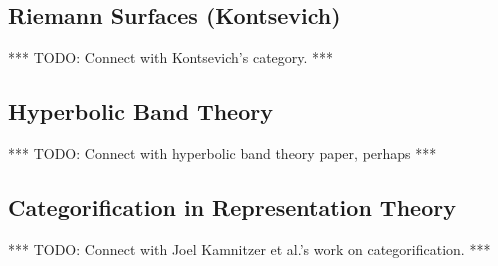 \documentclass{amsart}
\newcommand{\TODO}[1]{{\color{blue!55!black} *** TODO: #1 ***}}
\numberwithin{thm}{section}
\theoremstyle{definition}
\begin{document}
\subsection{Riemann Surfaces (Kontsevich)}

\TODO{Connect with Kontsevich's category.}

\subsection{Hyperbolic Band Theory}

\TODO{Connect with hyperbolic band theory paper, perhaps}

\subsection{Categorification in Representation Theory}

\TODO{Connect with Joel Kamnitzer et al.'s work on categorification.}

%

\pagebreak


{}

\end{document}
